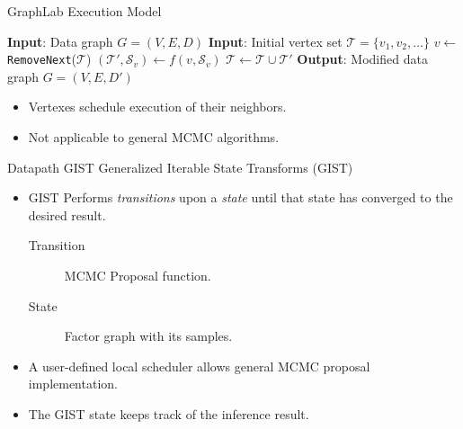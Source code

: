 \documentclass[onlymath,xcolor=pdftex,dvipsnames,table]{beamer}
\newcommand{\gist}{\textsc{GIST}\xspace}
\let\oldemph\emph
\renewcommand{\emph}[1]{{\color{Blue}\oldemph{#1}}}
\newcommand{\head}[1]{{\large\color{OliveGreen}#1\\[2pt]}}
\begin{document}
\begin{frame}{GraphLab Execution Model}
\begin{algorithm}[H]\footnotesize
  \caption{\footnotesize GraphLab Execution Model}\label{alg:execution}
  \begin{algorithmic}
    \State\textbf{Input}: Data graph $G=(V,E,D)$
    \State\textbf{Input}: Initial vertex set $\mathcal{T}=\{v_1,v_2,\ldots\}$
      \State $v\gets $\texttt{RemoveNext}($\mathcal{T}$)
      \State $(\mathcal{T}',\mathcal{S}_v)\gets f(v,\mathcal{S}_v)$
      \State $\mathcal{T}\gets\mathcal{T}\cup\mathcal{T}'$ 
    \EndWhile
    \State\textbf{Output}: Modified data graph $G=(V,E,D')$
  \end{algorithmic}
\end{algorithm}

\begin{itemize}
  \item Vertexes schedule execution of their neighbors.
  \item Not applicable to general MCMC algorithms.
\end{itemize}

\end{frame}

\begin{frame}{Datapath \gist}
\head{Generalized Iterable State Transforms (GIST)}
\begin{itemize}
  \item GIST Performs \emph{transitions} upon a \emph{state} until that state has converged to the desired result.
  \begin{description}
    \item[Transition] MCMC Proposal function.
    \item[State] Factor graph with its samples.
  \end{description}
  \item A user-defined local scheduler allows general MCMC proposal implementation.
  \item The GIST state keeps track of the inference result.
\end{itemize}
\end{frame}

\end{document}
